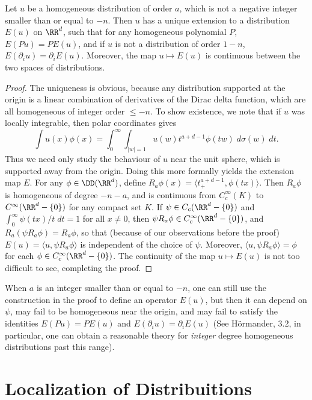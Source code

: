 \begin{theorem}
    Let $u$ be a homogeneous distribution of order $a$, which is not a negative integer smaller than or equal to $-n$. Then $u$ has a unique extension to a distribution $E(u)$ on $\RR^d$, such that for any homogeneous polynomial $P$, $E(Pu) = P E(u)$, and if $u$ is not a distribution of order $1-n$, $E(\partial_i u) = \partial_i E(u)$. Moreover, the map $u \mapsto E(u)$ is continuous between the two spaces of distributions.
\end{theorem}
\begin{proof}
    The uniqueness is obvious, because any distribution supported at the origin is a linear combination of derivatives of the Dirac delta function, which are all homogeneous of integer order $\leq -n$. To show existence, we note that if $u$ was locally integrable, then polar coordinates gives
    \[ \int u(x) \phi(x) = \int_0^\infty \int_{|w| = 1} u(w) t^{a + d-1} \phi(t w)\; d\sigma(w)\; dt. \]
    Thus we need only study the behaviour of $u$ near the unit sphere, which is supported away from the origin. Doing this more formally yields the extension map $E$. For any $\phi \in \DD(\RR^d)$, define $R_a \phi(x) = \langle t^{a + d-1}_+, \phi(tx) \rangle$. Then $R_a \phi$ is homogeneous of degree $-n-a$, and is continuous from $C_c^\infty(K)$ to $C^\infty(\RR^d - \{ 0 \})$ for any compact set $K$. If $\psi \in C_c(\RR^d - \{ 0 \})$ and $\int_0^\infty \psi(tx)/t\; dt = 1$ for all $x \neq 0$, then $\psi R_a \phi \in C_c^\infty(\RR^d - \{ 0 \})$, and $R_a(\psi R_a \phi) = R_a \phi$, so that (because of our observations before the proof) $E(u) = \langle u, \psi R_a \phi \rangle$ is independent of the choice of $\psi$. Moreover, $\langle u, \psi R_a \phi \rangle = \phi$ for each $\phi \in C_c^\infty(\RR^d - \{ 0 \})$. The continuity of the map $u \mapsto E(u)$ is not too difficult to see, completing the proof.
\end{proof}

When $a$ is an integer smaller than or equal to $-n$, one can still use the construction in the proof to define an operator $E(u)$, but then it can depend on $\psi$, may fail to be homogeneous near the origin, and may fail to satisfy the identities $E(Pu) = PE(u)$ and $E(\partial_i u) = \partial_i E(u)$ (See H\"{o}rmander, 3.2, in particular, one can obtain a reasonable theory for \emph{integer} degree homogeneous distributions past this range).

\section{Localization of Distribuitions}

